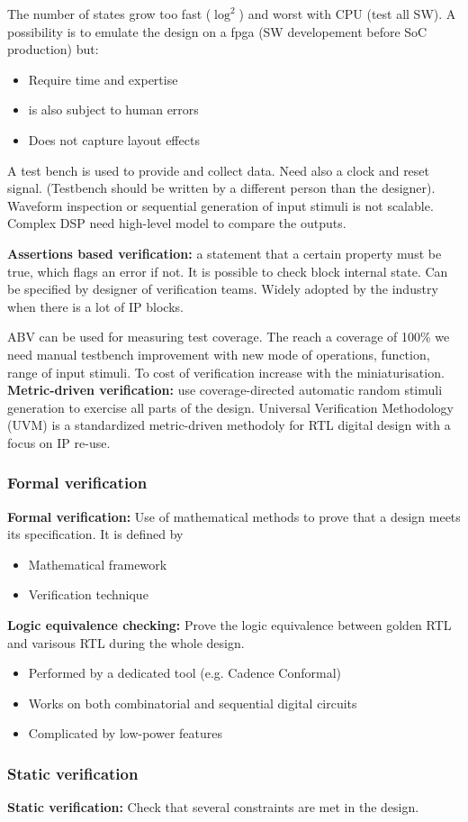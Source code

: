 The number of states grow too fast (\(\log^2\)) and worst with CPU (test all SW). A possibility is to emulate the design on a fpga (SW developement before SoC production) but:
\begin{itemize}
  \item Require time and expertise
  \item is also subject to human errors
  \item Does not capture layout effects
\end{itemize}

A test bench is used to provide and collect data. Need also a clock and reset signal. (Testbench should be written by a different person than the designer). Waveform inspection or sequential generation of input stimuli is not scalable. Complex DSP need high-level model to compare the outputs.


\textbf{Assertions based verification:} a statement that a certain property must be true, which flags an error if not. It is possible to check block internal state. Can be specified by designer of verification teams. Widely adopted by the industry when there is a lot of IP blocks.

\bigbreak
ABV can be used for measuring test coverage. The reach a coverage of 100\% we need manual testbench improvement with new mode of operations, function, range of input stimuli. To cost of verification increase with the miniaturisation.
\bigbreak
\textbf{Metric-driven verification:} use coverage-directed automatic random stimuli generation to exercise all parts of the design. Universal Verification Methodology (UVM) is a standardized metric-driven methodoly for RTL digital design with a focus on IP re-use.
\subsubsection{Formal verification}
\textbf{Formal verification:} Use of mathematical methods to prove that a design meets its specification. It is defined by
\begin{itemize}
  \item Mathematical framework
  \item Verification technique
\end{itemize}

\textbf{Logic equivalence checking:} Prove the logic equivalence between golden RTL and varisous RTL during the whole design.
\begin{itemize}
  \item Performed by a dedicated tool (e.g. Cadence Conformal)
  \item Works on both combinatorial and sequential digital circuits
  \item Complicated by low-power features
\end{itemize}


\subsubsection{Static verification}
\textbf{Static verification: } Check that several constraints are met in the design.
